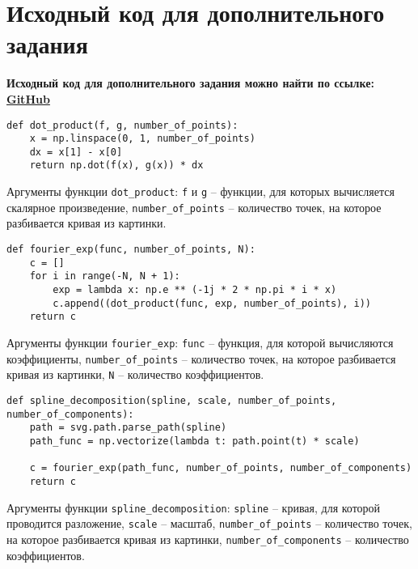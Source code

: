 \section{Исходный код для дополнительного задания}
\label{appendix:appendixB}

\textbf{Исходный код для дополнительного задания можно найти по ссылке: \href{https://github.com/edelwiw/FourierDrawing}{GitHub}} 

\begin{lstlisting}[style=python_white, caption={Скалярное произведение на интервале [1, 0]}, label=lst:dot_product_cat, belowskip=-0.8\baselineskip]
def dot_product(f, g, number_of_points):
    x = np.linspace(0, 1, number_of_points)
    dx = x[1] - x[0]
    return np.dot(f(x), g(x)) * dx
\end{lstlisting}
Аргументы функции \texttt{dot\_product}: \texttt{f} и \texttt{g} -- функции, для которых вычисляется скалярное произведение, \texttt{number\_of\_points} -- количество точек, на которое разбивается кривая из картинки. 
\newline

\begin{lstlisting}[style=python_white, caption={Вычисление коэффициентов Фурье}, label=lst:fourier_cat, belowskip=-0.8\baselineskip]
def fourier_exp(func, number_of_points, N):
    c = []
    for i in range(-N, N + 1):
        exp = lambda x: np.e ** (-1j * 2 * np.pi * i * x)
        c.append((dot_product(func, exp, number_of_points), i))
    return c
\end{lstlisting}
Аргументы функции \texttt{fourier\_exp}: \texttt{func} -- функция, для которой вычисляются коэффициенты, \texttt{number\_of\_points} -- количество точек, на которое разбивается кривая из картинки, \texttt{N} -- количество коэффициентов.
\newline

\begin{lstlisting}[style=python_white, caption={Разложение линии по Фурье}, label=lst:spline_decomposition, belowskip=-0.8\baselineskip]
def spline_decomposition(spline, scale, number_of_points, number_of_components):
    path = svg.path.parse_path(spline)
    path_func = np.vectorize(lambda t: path.point(t) * scale)

    c = fourier_exp(path_func, number_of_points, number_of_components)
    return c
\end{lstlisting}
Аргументы функции \texttt{spline\_decomposition}: \texttt{spline} -- кривая, для которой проводится разложение, \texttt{scale} -- масштаб, \texttt{number\_of\_points} -- количество точек, на которое разбивается кривая из картинки, \texttt{number\_of\_components} -- количество коэффициентов.
\newline

